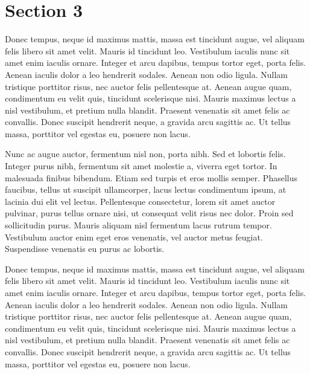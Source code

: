 \documentclass[onecolumn,superscriptaddress,11pt,aps]{revtex4}
\begin{document}
\section{Section 3}

Donec tempus, neque id maximus mattis, massa est tincidunt augue, vel aliquam felis libero sit amet velit. Mauris id tincidunt leo. Vestibulum iaculis nunc sit amet enim iaculis ornare. Integer et arcu dapibus, tempus tortor eget, porta felis. Aenean iaculis dolor a leo hendrerit sodales. Aenean non odio ligula. Nullam tristique porttitor risus, nec auctor felis pellentesque at. Aenean augue quam, condimentum eu velit quis, tincidunt scelerisque nisi. Mauris maximus lectus a nisl vestibulum, et pretium nulla blandit. Praesent venenatis sit amet felis ac convallis. Donec suscipit hendrerit neque, a gravida arcu sagittis ac. Ut tellus massa, porttitor vel egestas eu, posuere non lacus.

Nunc ac augue auctor, fermentum nisl non, porta nibh. Sed et lobortis felis. Integer purus nibh, fermentum sit amet molestie a, viverra eget tortor. In malesuada finibus bibendum. Etiam sed turpis et eros mollis semper. Phasellus faucibus, tellus ut suscipit ullamcorper, lacus lectus condimentum ipsum, at lacinia dui elit vel lectus. Pellentesque consectetur, lorem sit amet auctor pulvinar, purus tellus ornare nisi, ut consequat velit risus nec dolor. Proin sed sollicitudin purus. Mauris aliquam nisl fermentum lacus rutrum tempor. Vestibulum auctor enim eget eros venenatis, vel auctor metus feugiat. Suspendisse venenatis eu purus ac lobortis.

Donec tempus, neque id maximus mattis, massa est tincidunt augue, vel aliquam felis libero sit amet velit. Mauris id tincidunt leo. Vestibulum iaculis nunc sit amet enim iaculis ornare. Integer et arcu dapibus, tempus tortor eget, porta felis. Aenean iaculis dolor a leo hendrerit sodales. Aenean non odio ligula. Nullam tristique porttitor risus, nec auctor felis pellentesque at. Aenean augue quam, condimentum eu velit quis, tincidunt scelerisque nisi. Mauris maximus lectus a nisl vestibulum, et pretium nulla blandit. Praesent venenatis sit amet felis ac convallis. Donec suscipit hendrerit neque, a gravida arcu sagittis ac. Ut tellus massa, porttitor vel egestas eu, posuere non lacus.





\end{document}
